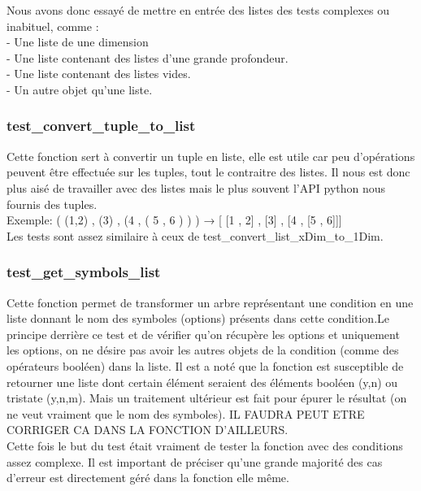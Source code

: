 \documentclass[16pts]{report}
\begin{document}
Nous avons donc essayé de mettre en entrée des listes des tests complexes ou 
inabituel, comme : \\

- Une liste de une dimension \\
- Une liste contenant des listes d'une grande profondeur. \\
- Une liste contenant des listes vides. \\
- Un autre objet qu'une liste. \\

\subsubsection{test_convert_tuple_to_list}

Cette fonction sert à convertir un tuple en liste, elle est utile car peu
d'opérations peuvent être effectuée sur les tuples, tout le contraitre des 
listes. Il nous est donc plus aisé de travailler avec des listes mais le 
plus souvent l'API python nous fournis des tuples. \\

Exemple: ( (1,2) , (3) , (4 , ( 5 , 6 ) ) ) → [ [1 , 2] , [3] , [4 , [5 , 6]]] 
\\

Les tests sont assez similaire à ceux de test_convert_list_xDim_to_1Dim. \\


\subsubsection{test_get_symbols_list}

Cette fonction permet de transformer un arbre représentant une condition
en une liste donnant le nom des symboles (options) présents dans cette 
condition.Le principe derrière ce test et de vérifier qu'on récupère les 
options et uniquement les options, on ne désire pas avoir les autres objets 
de la condition (comme des opérateurs booléen) dans la liste.
Il est a noté que la fonction est susceptible de retourner une liste dont 
certain élément seraient des éléments booléen (y,n) ou tristate (y,n,m). 
Mais un traitement ultérieur est fait pour épurer le résultat (on ne 
veut vraiment que le nom des symboles). IL FAUDRA PEUT ETRE CORRIGER CA 
DANS LA FONCTION D'AILLEURS.\\

Cette fois le but du test était vraiment de tester la fonction avec des 
conditions assez complexe. Il est important de préciser qu'une grande 
majorité des cas d'erreur est directement géré dans la fonction elle même.\\
\end{document}
